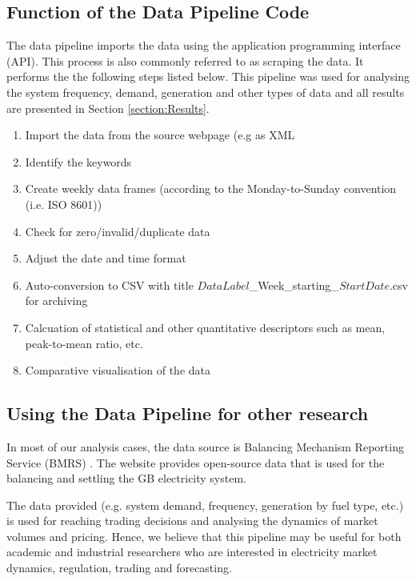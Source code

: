 \documentclass[energies,article,submit,moreauthors,pdftex]{Definitions/mdpi}
\begin{document}
\subsection{Function of the Data Pipeline Code}
The data pipeline imports the data using the application programming interface (API). This process is also commonly referred to as scraping the data. It performs the the following steps listed below. This pipeline was used for analysing the system frequency, demand, generation and other types of data and all results are presented in Section \ref{section:Results}.

\begin{enumerate}
    \item Import the data from the source webpage (e.g as XML
    \item Identify the keywords
    \item Create weekly data frames (according to the Monday-to-Sunday convention (i.e. ISO 8601))
    \item Check for zero/invalid/duplicate data
    \item Adjust the date and time format
    \item Auto-conversion to CSV with title $DataLabel$\_Week\_starting\_$StartDate$.csv for archiving
    \item Calcuation of statistical and other quantitative descriptors such as mean, peak-to-mean ratio, etc.
    \item Comparative visualisation of the data
\end{enumerate}

\subsection{Using the Data Pipeline for other research}
In most of our analysis cases, the data source is Balancing Mechanism Reporting Service (BMRS) \cite{Elexon2019BMRSArchitecture}. The website \cite{ElectricityBMRS} provides open-source data that is used for the balancing and settling the GB electricity system.

The data provided (e.g. system  demand, frequency, generation by fuel type, etc.) is used for reaching trading decisions and analysing the dynamics of market volumes and pricing. Hence, we believe that this pipeline may be useful for both academic and industrial researchers who are interested in electricity market dynamics, regulation, trading and forecasting.
\end{document}
